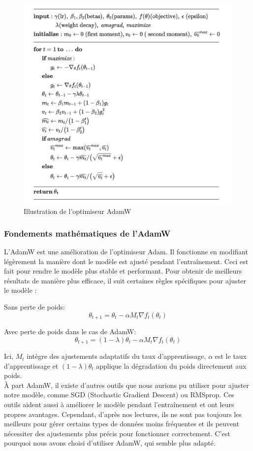 \documentclass{article}
\begin{document}
\begin{figure}[h]
    \centering
    \includegraphics[width=0.7\linewidth]{AdamW.png}
    \caption{Illustration de l'optimiseur AdamW}
    \label{fig:adamw}
\end{figure}

\subsubsection{Fondements mathématiques de l'AdamW}
L'AdamW est une amélioration de l'optimiseur Adam. Il fonctionne en modifiant légèrement la manière dont le modèle est ajusté pendant l'entraînement. Ceci est fait pour rendre le modèle plus stable et performant. Pour obtenir de meilleurs résultats de manière plus efficace, il suit certaines règles spécifiques pour ajuster le modèle :

Sans perte de poids:
\begin{equation}
    \theta_{t+1} = \theta_t - \alpha M_t \nabla f_t(\theta_t)
\end{equation}

Avec perte de poids dans le cas de AdamW:
\begin{equation}
    \theta_{t+1} = (1 - \lambda) \theta_t - \alpha M_t \nabla f_t(\theta_t)
\end{equation}

Ici, $M_t$ intègre des ajustements adaptatifs du taux d'apprentissage, $\alpha$ est le taux d'apprentissage et $(1 - \lambda) \theta_t$ applique la dégradation du poids directement aux poids. \\

À part AdamW, il existe d'autres outils que nous aurions pu utiliser pour ajuster notre modèle, comme SGD (Stochastic Gradient Descent) ou RMSprop. Ces outils aident aussi à améliorer le modèle pendant l'entraînement et ont leurs propres avantages. Cependant, d'après nos lectures, ils ne sont pas toujours les meilleurs pour gérer certains types de données moins fréquentes et ils peuvent nécessiter des ajustements plus précis pour fonctionner correctement. C'est pourquoi nous avons choisi d'utiliser AdamW, qui semble plus adapté.
\end{document}

